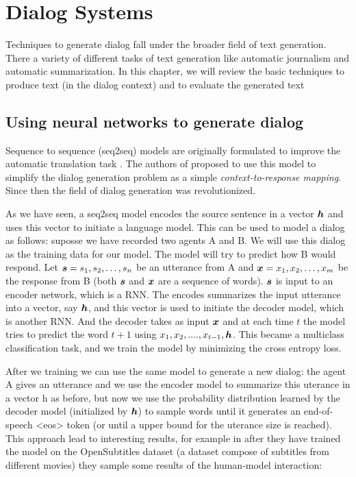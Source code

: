 \chapter{Dialog Systems}
\label{ch:03-dialog-systems}

Techniques to generate dialog fall under the broader field of text generation. There a variety of different tasks of text generation like automatic journalism and automatic summarization. In this chapter, we will review the basic techniques to produce text (in the dialog context) and to evaluate the generated text


\section{Using neural networks to generate dialog}
\label{ch:03-gen}

Sequence to sequence (seq2seq) models are originally formulated to improve the automatic translation task \cite{Sustskever}. The authors of \cite{DBLP:journals/corr/VinyalsL15} proposed to use this model to simplify the dialog generation problem as a simple \textit{context-to-response mapping}. Since then the field of dialog generation was revolutionized. 

As we have seen, a seq2seq model encodes the source sentence in a vector $\bm{h}$ and uses this vector to initiate a language model. This can be used to model a dialog as follows: suposse we have recorded two agents A and B. We will use this dialog as the training data for our model. The model will try to predict how B would respond. Let $\bm{s} = s_1, s_2, \dots, s_n$ be an utterance from A and  $\bm{x} = x_1, x_2, \dots, x_m$ be the response from B (both $\bm{s}$ and $\bm{x}$ are a sequence of words). $\bm{s}$ is input to an encoder network, which is a RNN. The encodes summarizes the input utterance into a vector, say $\bm{h}$, and this vector is used to initiate the decoder model, which is another RNN. And the decoder takes as input $\bm{x}$ and at each time $t$ the model tries to predict the word $t+1$ using $x_1, x_2, ...., x_{t-1}, \bm{h}$. This became a multiclass classification task, and we train the model by minimizing the cross entropy loss.


After we training we can use the same model to generate a new dialog: the agent A gives an utterance and we use the encoder model to summarize this uterance in a vector h as before, but now we use the probability distribution learned by the decoder model (initialized by $\bm{h}$) to sample words until it generates an end-of-speech <eos> token (or until a upper bound for the uterance size is reached). This approach lead to interesting results, for example in \cite{DBLP:journals/corr/VinyalsL15} after they have trained the model on the OpenSubtitles dataset (a dataset compose of subtitles from different movies) they sample some results of the human-model interaction:

